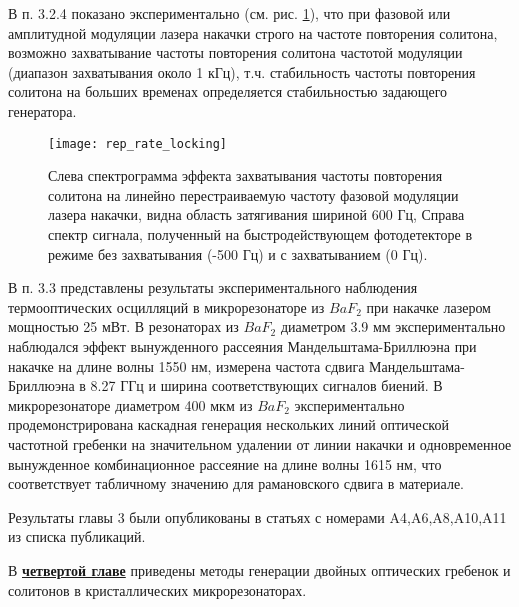 В п. 3.2.4 показано экспериментально (см. рис. \ref{rep_rate_locking}), что при фазовой или амплитудной модуляции лазера накачки строго на частоте повторения солитона, возможно захватывание частоты повторения солитона частотой модуляции (диапазон захватывания около 1 кГц), т.ч. стабильность частоты повторения солитона на больших временах определяется стабильностью задающего генератора.

\begin{figure}[!htb]
  \centering
  \texttt{[image: rep\_rate\_locking]}
  \caption{Слева спектрограмма эффекта захватывания частоты повторения солитона на линейно перестраиваемую частоту фазовой модуляции лазера накачки, видна область затягивания шириной 600 Гц, Справа спектр сигнала, полученный на быстродействующем фотодетекторе в режиме без захватывания (-500 Гц) и с захватыванием (0 Гц).}
  \label{rep_rate_locking}
\end{figure}

В п. 3.3 представлены результаты экспериментального наблюдения термооптических осцилляций в микрорезонаторе из $BaF_2$ при накачке лазером мощностью 25 мВт. В резонаторах из $BaF_2$ диаметром 3.9 мм экспериментально наблюдался эффект вынужденного рассеяния Мандельштама-Бриллюэна при накачке на длине волны 1550 нм, измерена частота сдвига Мандельштама-Бриллюэна в 8.27 ГГц и ширина соответствующих сигналов биений. В микрорезонаторе диаметром 400 мкм из $BaF_2$ экспериментально продемонстрирована каскадная генерация нескольких линий оптической частотной гребенки на значительном удалении от линии накачки и одновременное вынужденное комбинационное рассеяние на длине волны 1615 нм, что соответствует табличному значению для рамановского сдвига в материале.

Результаты главы 3 были опубликованы в статьях с номерами A4,A6,A8,A10,A11 из списка публикаций.

В \underline{\textbf{четвертой главе}} приведены методы генерации двойных оптических гребенок и солитонов в кристаллических микрорезонаторах.

